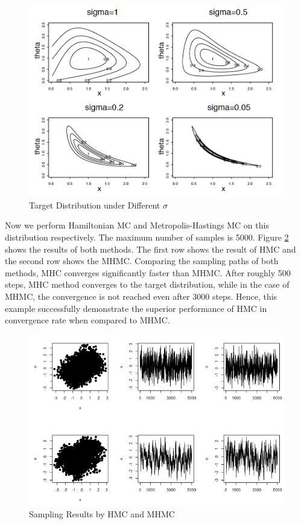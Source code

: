 \documentclass[twoside]{article}
\begin{document}
\begin{figure}
\centering
\includegraphics[scale=0.45]{sigma.png}
\caption{Target Distribution under Different $\sigma$}
\label{sigma}
\end{figure}

Now we perform Hamiltonian MC and Metropolis-Hastings MC on this distribution respectively. The maximum number of samples is 5000. Figure \ref{result} shows the results of both methods. The first row shows the result of HMC and the second row shows the MHMC. Comparing the sampling paths of both methods, MHC converges significantly faster than MHMC. After roughly 500 steps, MHC method converges to the target distribution, while in the case of MHMC, the convergence is not reached even after 3000 steps. Hence, this example successfully demonstrate the superior performance of HMC in convergence rate when compared to MHMC.

\begin{figure}
\centering
\includegraphics[scale=0.6]{sigma2.png}
\caption{Sampling Results by HMC and MHMC}
\label{result}
\end{figure}
\end{document}

